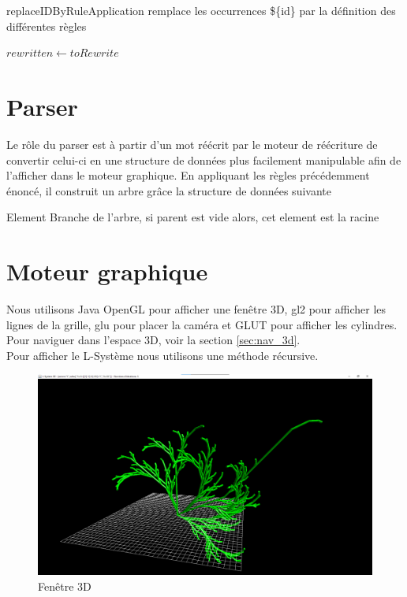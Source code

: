 \begin{algorithm}
\DontPrintSemicolon
\KwIn{toRewrite: $String$, rules : $List[Tuple[String, String]$}
\caption{{\sc replaceIDByRuleApplication} remplace les occurrences \$\{id\} par la définition des différentes règles}
$rewritten \gets toRewrite$\;
\end{algorithm}

\clearpage

\section{Parser}
\label{sec:parser}

Le rôle du parser est à partir d'un mot réécrit par le moteur de réécriture de convertir celui-ci en une structure de données plus facilement manipulable afin de l'afficher dans le moteur graphique.
En appliquant les règles précédemment énoncé, il construit un arbre grâce la structure de données suivante

\begin{algorithm}
\DontPrintSemicolon
\caption{{\sc Element} Branche de l'arbre, si parent est vide alors, cet element est la racine}
\end{algorithm}


\section{Moteur graphique}
\label{sec:interface3d}

Nous utilisons Java OpenGL pour afficher une fenêtre 3D, gl2 pour afficher les lignes de la grille, glu pour placer la caméra et GLUT pour afficher les cylindres.\\
Pour naviguer dans l'espace 3D, voir la section \ref{sec:nav_3d}.\\
Pour afficher le L-Système nous utilisons une méthode récursive.

\begin{figure}[h!]
    \centering
    \includegraphics[width=0.8\linewidth]{pics/3dGUI.png}
    \caption{Fenêtre 3D}
    \label{fig:3d_frame}
\end{figure}

